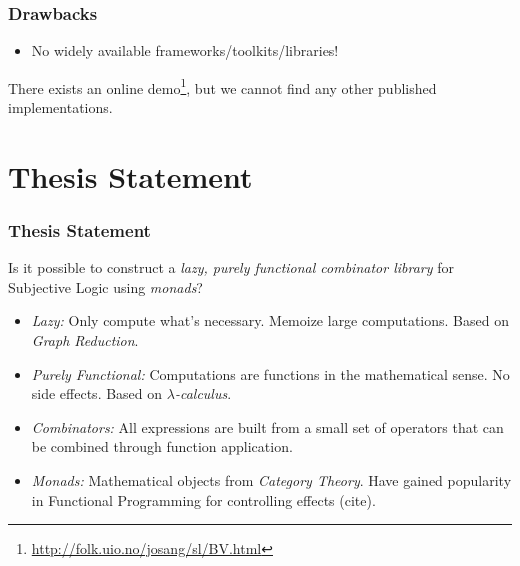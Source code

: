 \documentclass{beamer}
\begin{document}

\begin{frame}
\frametitle{Drawbacks}

\begin{itemize}
  \item No widely available frameworks/toolkits/libraries!
\end{itemize}

There exists an online demo\footnote{\url{http://folk.uio.no/josang/sl/BV.html}},
but we cannot find any other published implementations.

\end{frame}

%
%

\section{Thesis Statement}

\begin{frame}
\frametitle{Thesis Statement}

Is it possible to construct a \emph{lazy, purely functional combinator library} for Subjective
Logic using \emph{monads}?

\begin{itemize}
  \item \emph{Lazy:} Only compute what's necessary. Memoize large computations. Based
    on \emph{Graph Reduction}.
  \item \emph{Purely Functional:} Computations are functions in the mathematical sense.
    No side effects. Based on \emph{$\lambda$-calculus}.
  \item \emph{Combinators:} All expressions are built from a small set of operators that
    can be combined through function application.
  \item \emph{Monads:} Mathematical objects from \emph{Category Theory}. Have gained
    popularity in Functional Programming for controlling effects (cite).
\end{itemize}

\end{frame}

\end{document}
